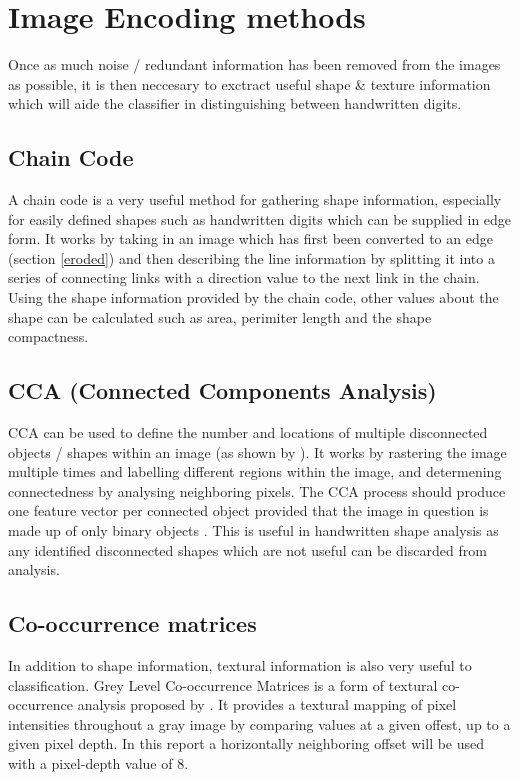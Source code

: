 \documentclass[12pt]{article}
\begin{document}
\section{Image Encoding methods} \label{encoding}
  Once as much noise / redundant information has been removed from the images as possible, it is then neccesary to exctract useful shape \& texture information which will aide the classifier in distinguishing between handwritten digits.

  \subsection{Chain Code} \label{chain-code}
   A chain code \citep{freeman1961encoding} is a very useful method for gathering shape information, especially for easily defined shapes such as handwritten digits which can be supplied in edge form. It works by taking in an image which has first been converted to an edge (section \ref{eroded}) and then describing the line information by splitting it into a series of connecting links with a direction value to the next link in the chain. Using the shape information provided by the chain code, other values about the shape can be calculated such as area, perimiter length and the shape compactness.

  \subsection{CCA (Connected Components Analysis)}
    CCA can be used to define the number and locations of multiple disconnected objects / shapes within an image (as shown by \cite{rosenfeld1966sequential}). It works by rastering the image multiple times and labelling different regions within the image, and determening connectedness by analysing neighboring pixels. The CCA process should produce one feature vector per connected object provided that the image in question is made up of only binary objects \citep{cca}. This is useful in handwritten shape analysis as any identified disconnected shapes which are not useful can be discarded from analysis.

  \subsection{Co-occurrence matrices}
    In addition to shape information, textural information is also very useful to classification. Grey Level Co-occurrence Matrices is a form of textural co-occurrence analysis proposed by \cite{haralick1973textural}. It provides a textural mapping of pixel intensities throughout a gray image by comparing values at a given offest, up to a given pixel depth. In this report a horizontally neighboring offset will be used with a pixel-depth value of 8.
\end{document}
